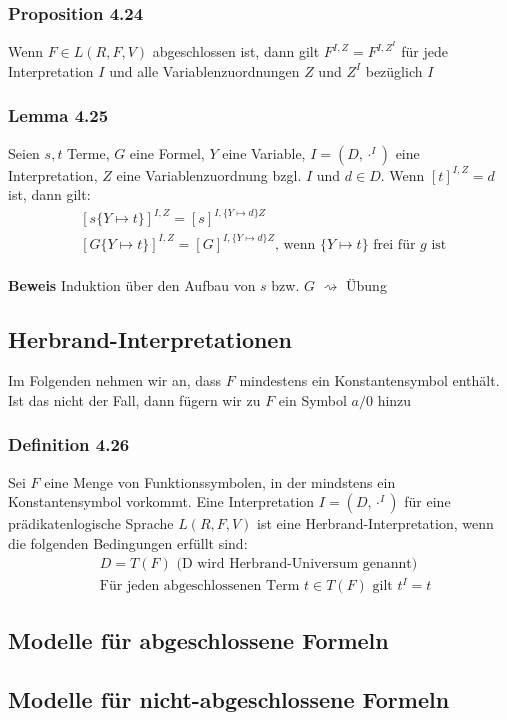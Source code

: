 \subsubsection{Proposition 4.24}
Wenn \(F\in L(R,F,V)\) abgeschlossen ist, dann gilt \(F^{I,Z} = F^{I,Z^I}\) für jede Interpretation \(I\) und alle Variablenzuordnungen \(Z\) und \(Z^I\) bezüglich \(I\)
\subsubsection{Lemma 4.25}
Seien \(s,t\) Terme, \(G\) eine Formel, \(Y\) eine Variable, \(I=(D,\cdot ^I)\) eine Interpretation, \(Z\) eine Variablenzuordnung bzgl. \(I\) und \(d\in D\). Wenn \([t]^{I,Z}= d\) ist, dann gilt:
\begin{align*}
&[s\{Y\mapsto t\}]^{I,Z}=[s]^{I,\{Y\mapsto d\} Z} \\
&[G\{Y\mapsto t\}]^{I,Z}=[G]^{I,\{Y\mapsto d\} Z}\text{, wenn } \{Y\mapsto t\} \text{ frei für } g \text{ ist }
\end{align*}
\\\textbf{Beweis} Induktion über den Aufbau von \(s\) bzw. \(G\) \(\rightsquigarrow\) Übung
\subsection{Herbrand-Interpretationen}
Im Folgenden nehmen wir an, dass \(F\) mindestens ein Konstantensymbol enthält. Ist das nicht der Fall, dann fügern wir zu \(F\) ein Symbol \(a/0\) hinzu
\subsubsection{Definition 4.26}
Sei \(F\) eine Menge von Funktionssymbolen, in der mindstens ein Konstantensymbol vorkommt. Eine Interpretation \(I=(D,\cdot ^I)\) für eine prädikatenlogische Sprache \(L(R,F,V)\) ist eine Herbrand-Interpretation, wenn die folgenden Bedingungen erfüllt sind:
\begin{align*}
	&D = T(F) \text{ (D wird Herbrand-Universum genannt})\\
	&\text{Für jeden abgeschlossenen Term } t\in T(F) \text{ gilt } t^I = t
\end{align*}
\subsection{Modelle für abgeschlossene Formeln}
\subsection{Modelle für nicht-abgeschlossene Formeln}
